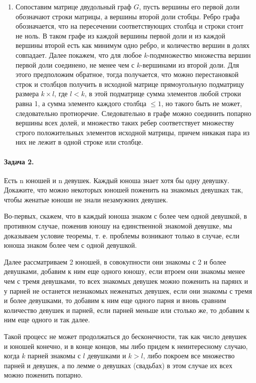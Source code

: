 \documentclass[a4paper,12pt]{article}
\begin{document}
\begin{Proof}
\begin{enumerate}
\item Сопоставим матрице двудольный граф $G$, пусть вершины его первой доли обозначают строки матрицы, а вершины второй доли стобцы. Ребро графа обозначается, что на пересечении соответствующих столбца и строки стоит не ноль. В таком графе из каждой вершины первой доли и из каждой вершины второй есть как минимум одно ребро, и количество вершин в долях совпадает. Далее покажем, что для любое $k$-подмножество множества вершин первой доли соединено, не менее чем с $k$-вершинами из второй доли. Для этого предположим обратное, тогда получается, что можно перестановкой строк и столбцов получить в исходной матрице прямоугольную подматрицу размера $k \times l$, где $l < k$, в этой подматрице сумма элементов любой строки равна 1, а сумма элементо каждого столбца $\le 1$, но такого быть не может, следовательно протиоречие. Следовательно в графе можно соединить попарно вершины всех долей, и множество таких ребер соответствует множеству строго положительных элементов исходной матрицы, причем никакая пара из них не лежит в одной строке или столбце.
\end{enumerate}
\end{Proof}

\paragraph{Задача 2.} Есть n юношей и n девушек. Каждый юноша знает хотя бы одну девушку. Докажите, что можно некоторых юношей поженить на знакомых девушках так, чтобы женатые юноши не знали незамужних девушек.

\begin{Proof}
Во-первых, скажем, что в каждый юноша знаком с более чем одной девушкой, в противном случае, поженив юношу на единственной знакомой девушке, мы доказываем условие теоремы, т. е. проблемы возникают только в случае, если юноша знаком более чем с одной девушкой.

Далее рассматриваем 2 юношей, в совокупности они знакомы с 2 и более девушками, добавим к ним еще одного юношу, если втроем они знакомы менее чем с тремя девушками, то всех знакомых девушек можно поженить на парянх и у парней не останется незнакомых неженатых девушек, если они знакомы с тремя и более девушками, то добавим к ним еще одного парня и вновь сравним количество девушек и парней, если парней меньше или столько же, то добавим к ним еще одного и так далее.

Такой процесс не может продолжаться до бесконечности, так как число девушек и юношей конечно, и в конце концов, мы либо придем к неинтересному случаю, когда $k$ парней знакомы с $l$ девушками и $k>l$, либо покроем все множество парней и девушек, а по лемме о девушках (свадьбах) в этом случае их всех можно поженить попарно.
\end{Proof}
\end{document}
